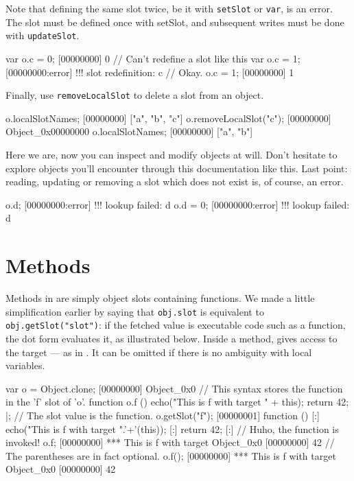 Note that defining the same slot twice, be it with \lstinline{setSlot} or
\lstinline{var}, is an error. The slot must be defined once with setSlot,
and subsequent writes must be done with \lstinline{updateSlot}.

\begin{urbiscript}
var o.c = 0;
[00000000] 0
// Can't redefine a slot like this
var o.c = 1;
[00000000:error] !!! slot redefinition: c
// Okay.
o.c = 1;
[00000000] 1
\end{urbiscript}

Finally, use \lstinline{removeLocalSlot} to delete a slot from an object.

\begin{urbiscript}
o.localSlotNames;
[00000000] ["a", "b", "c"]
o.removeLocalSlot("c");
[00000000] Object_0x00000000
o.localSlotNames;
[00000000] ["a", "b"]
\end{urbiscript}

Here we are, now you can inspect and modify objects at will. Don't
hesitate to explore \us objects you'll encounter through this
documentation like this. Last point: reading, updating or removing a
slot which does not exist is, of course, an error.

\begin{urbiscript}
o.d;
[00000000:error] !!! lookup failed: d
o.d = 0;
[00000000:error] !!! lookup failed: d
\end{urbiscript}

\section{Methods}

Methods in \us are simply object slots containing functions. We made a
little simplification earlier by saying that \lstinline|obj.slot| is
equivalent to \lstinline|obj.getSlot("slot")|: if the fetched value is
executable code such as a function, the dot form evaluates it, as
illustrated below. Inside a method, \this gives access to
the target --- as in \Cxx.  It can be omitted if there is no ambiguity
with local variables.

\begin{urbiscript}[firstnumber=1]
var o = Object.clone;
[00000000] Object_0x0
// This syntax stores the function in the 'f' slot of 'o'.
function o.f ()
{
  echo("This is f with target " + this);
  return 42;
} |;
// The slot value is the function.
o.getSlot("f");
[00000001] function () {
[:]  echo("This is f with target ".'+'(this));
[:]  return 42;
[:]}
// Huho, the function is invoked!
o.f;
[00000000] *** This is f with target Object_0x0
[00000000] 42
// The parentheses are in fact optional.
o.f();
[00000000] *** This is f with target Object_0x0
[00000000] 42
\end{urbiscript}

